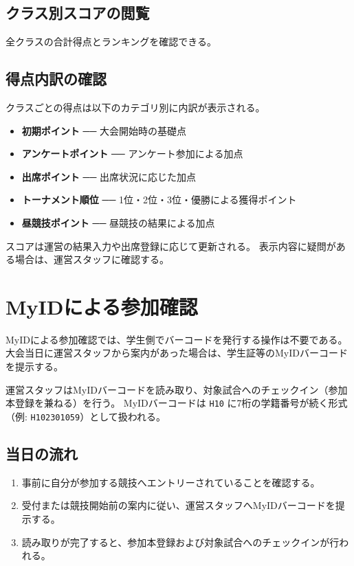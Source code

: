 \documentclass[12pt]{ltjsarticle}
\newcommand{\code}[1]{\colorbox{gray!20}{\texttt{#1}}}
\begin{document}
\subsection{クラス別スコアの閲覧}

全クラスの合計得点とランキングを確認できる。

\subsection{得点内訳の確認}

クラスごとの得点は以下のカテゴリ別に内訳が表示される。

\begin{itemize}
  \item \textbf{初期ポイント} ── 大会開始時の基礎点
  \item \textbf{アンケートポイント} ── アンケート参加による加点
  \item \textbf{出席ポイント} ── 出席状況に応じた加点
  \item \textbf{トーナメント順位} ── 1位・2位・3位・優勝による獲得ポイント
  \item \textbf{昼競技ポイント} ── 昼競技の結果による加点
\end{itemize}

スコアは運営の結果入力や出席登録に応じて更新される。
表示内容に疑問がある場合は、運営スタッフに確認する。

\newpage

\section{MyIDによる参加確認}\label{sec:myid}

MyIDによる参加確認では、学生側でバーコードを発行する操作は不要である。
大会当日に運営スタッフから案内があった場合は、学生証等のMyIDバーコードを提示する。

運営スタッフはMyIDバーコードを読み取り、対象試合へのチェックイン（参加本登録を兼ねる）を行う。
MyIDバーコードは \code{H10} に7桁の学籍番号が続く形式（例: \code{H102301059}）として扱われる。

\subsection{当日の流れ}

\begin{enumerate}
  \item 事前に自分が参加する競技へエントリーされていることを確認する。
  \item 受付または競技開始前の案内に従い、運営スタッフへMyIDバーコードを提示する。
  \item 読み取りが完了すると、参加本登録および対象試合へのチェックインが行われる。
\end{enumerate}
\end{document}
